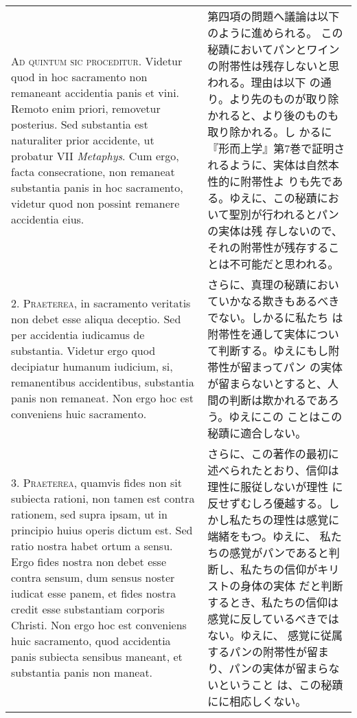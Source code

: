 \documentclass[10pt]{jsarticle} %
\begin{document}
\begin{longtable}{p{21em}p{21em}}
{\scshape Ad quintum sic proceditur}. Videtur quod in hoc sacramento non
remaneant accidentia panis et vini. Remoto enim priori, removetur
posterius. Sed substantia est naturaliter prior accidente, ut probatur
VII {\itshape Metaphys}. Cum ergo, facta consecratione, non remaneat substantia
panis in hoc sacramento, videtur quod non possint remanere accidentia
eius.

&

第四項の問題へ議論は以下のように進められる。
この秘蹟においてパンとワインの附帯性は残存しないと思われる。理由は以下
 の通り。より先のものが取り除かれると、より後のものも取り除かれる。し
 かるに『形而上学』第7巻で証明されるように、実体は自然本性的に附帯性よ
 りも先である。ゆえに、この秘蹟において聖別が行われるとパンの実体は残
 存しないので、それの附帯性が残存することは不可能だと思われる。


\\



2. {\scshape Praeterea}, in sacramento veritatis non debet esse aliqua deceptio. Sed
per accidentia iudicamus de substantia. Videtur ergo quod decipiatur
humanum iudicium, si, remanentibus accidentibus, substantia panis non
remaneat. Non ergo hoc est conveniens huic sacramento.

&

さらに、真理の秘蹟においていかなる欺きもあるべきでない。しかるに私たち
 は附帯性を通して実体について判断する。ゆえにもし附帯性が留まってパン
 の実体が留まらないとすると、人間の判断は欺かれるであろう。ゆえにこの
 ことはこの秘蹟に適合しない。

\\



3. {\scshape Praeterea}, quamvis fides non sit subiecta rationi, non tamen est
contra rationem, sed supra ipsam, ut in principio huius operis dictum
est. Sed ratio nostra habet ortum a sensu. Ergo fides nostra non debet
esse contra sensum, dum sensus noster iudicat esse panem, et fides
nostra credit esse substantiam corporis Christi. Non ergo hoc est
conveniens huic sacramento, quod accidentia panis subiecta sensibus
maneant, et substantia panis non maneat.

&

さらに、この著作の最初に述べられたとおり、信仰は理性に服従しないが理性
 に反せずむしろ優越する。しかし私たちの理性は感覚に端緒をもつ。ゆえに、
 私たちの感覚がパンであると判断し、私たちの信仰がキリストの身体の実体
 だと判断するとき、私たちの信仰は感覚に反しているべきではない。ゆえに、
 感覚に従属するパンの附帯性が留まり、パンの実体が留まらないということ
 は、この秘蹟にに相応しくない。



\end{longtable}
\end{document}
